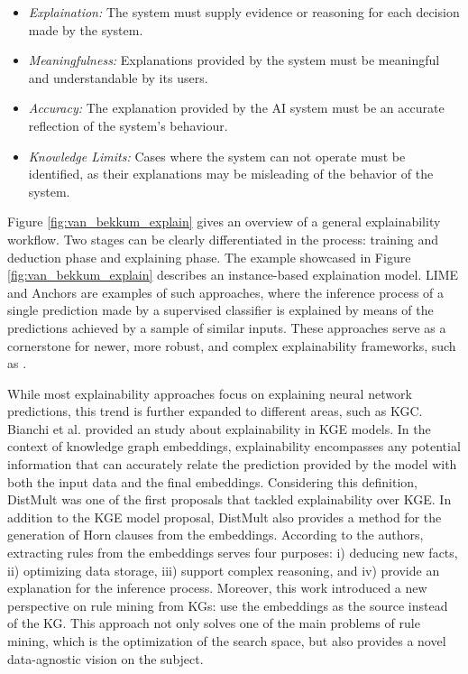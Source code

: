 \begin{itemize}
    \item \textit{Explaination:} The system must supply evidence or reasoning for each decision made by the system.
    \item \textit{Meaningfulness:} Explanations provided by the system must be meaningful and understandable by its users.
    \item \textit{Accuracy:} The explanation provided by the AI system must be an accurate reflection of the system's behaviour.
    \item \textit{Knowledge Limits:} Cases where the system can not operate must be identified, as their explanations may be misleading of the behavior of the system.
    
\end{itemize}

Figure \ref{fig:van_bekkum_explain} gives an overview of a general explainability workflow. Two stages can be clearly differentiated in the process: training and deduction phase and explaining phase. The example showcased in Figure \ref{fig:van_bekkum_explain} describes an instance-based explaination model. LIME \citep{ribeiro_lime_2016} and Anchors \citep{Ribeiro_Singh_Guestrin_2018} are examples of such approaches, where the inference process of a single prediction made by a supervised classifier is explained by means of the predictions achieved by a sample of similar inputs. These approaches serve as a cornerstone for newer, more robust, and complex explainability frameworks, such as \cite{arya_one_2019}. 

While most explainability approaches focus on explaining neural network predictions, this trend is further expanded to different areas, such as KGC. Bianchi et al. \citep{bianchi_kge_explainability_2020} provided an study about explainability in KGE models. In the context of knowledge graph embeddings, explainability encompasses any potential information that can accurately relate the prediction provided by the model with both the input data and the final embeddings. Considering this definition, DistMult \citep{distmult} was one of the first proposals that tackled explainability over KGE. In addition to the KGE model proposal, DistMult also provides a method for the generation of Horn clauses from the embeddings. According to the authors, extracting rules from the embeddings serves four purposes: i) deducing new facts, ii) optimizing data storage, iii) support complex reasoning, and iv) provide an explanation for the inference process. Moreover, this work introduced a new perspective on rule mining from KGs: use the embeddings as the source instead of the KG. This approach not only solves one of the main problems of rule mining, which is the optimization of the search space, but also provides a novel data-agnostic vision on the subject. 

